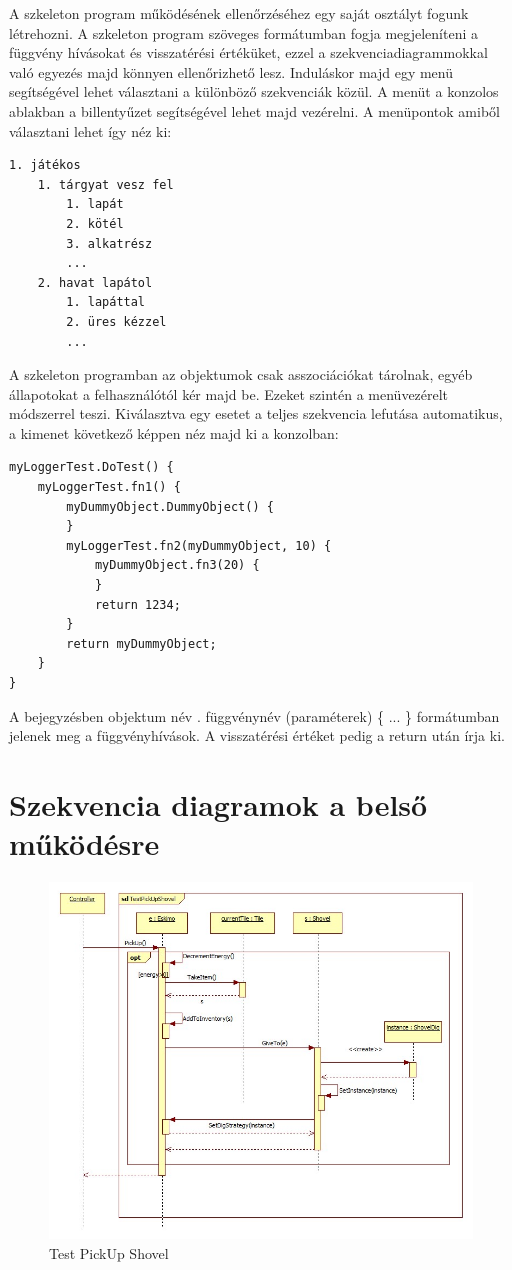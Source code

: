 A szkeleton program működésének ellenőrzéséhez egy saját osztályt fogunk létrehozni. A szkeleton program szöveges formátumban fogja megjeleníteni a függvény hívásokat és visszatérési értéküket, ezzel a szekvenciadiagrammokkal való egyezés majd könnyen ellenőrizhető lesz. Induláskor majd egy menü segítségével lehet választani a különböző szekvenciák közül. A menüt a konzolos ablakban a billentyűzet segítségével lehet majd vezérelni. A menüpontok amiből választani lehet így néz ki:
\begin{Verbatim}[samepage=true]
1. játékos
	1. tárgyat vesz fel
		1. lapát
		2. kötél
		3. alkatrész
		...
	2. havat lapátol
		1. lapáttal
		2. üres kézzel
		...
\end{Verbatim}
A szkeleton programban az objektumok csak asszociációkat tárolnak, egyéb állapotokat a felhasználótól kér majd be. Ezeket szintén a menüvezérelt módszerrel teszi. Kiválasztva egy esetet a teljes szekvencia lefutása automatikus, a kimenet következő képpen néz majd ki a konzolban:
\begin{Verbatim}[samepage=true]
myLoggerTest.DoTest() {
    myLoggerTest.fn1() {
        myDummyObject.DummyObject() {
        }
        myLoggerTest.fn2(myDummyObject, 10) {
            myDummyObject.fn3(20) {
            }
            return 1234;
        }
        return myDummyObject;
    }
}
\end{Verbatim}
A bejegyzésben objektum név . függvénynév (paraméterek) \{ ... \} formátumban jelenek meg a függvényhívások. A visszatérési értéket pedig a return után írja ki.

\pagebreak
\section{Szekvencia diagramok a belső működésre}

\begin{figure}[h]
	\begin{center}
		\includegraphics[width=17cm]{chapters/chapter05/diagrams/TestPickUpShovel.jpg}
		\caption{Test PickUp Shovel}
		\label{fig:Test PickUp Shovel}
	\end{center}
\end{figure}

